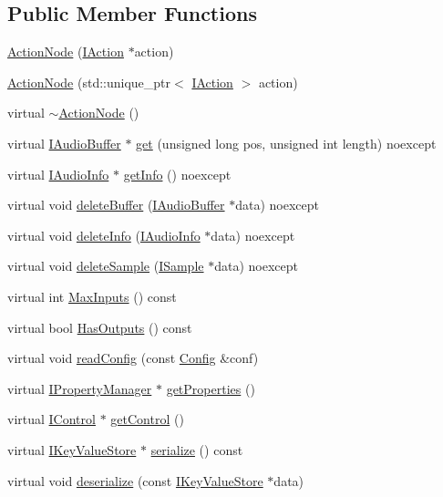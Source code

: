 \subsection*{Public Member Functions}
\begin{DoxyCompactItemize}
\item 
\hyperlink{classmaudio_1_1ActionNode_a14305cfd931a5fbec4b194153a198f62}{Action\-Node} (\hyperlink{classmaudio_1_1IAction}{I\-Action} $\ast$action)
\item 
\hyperlink{classmaudio_1_1ActionNode_a7d47bb0a6d57b72f5fbe7b59bf1535c0}{Action\-Node} (std\-::unique\-\_\-ptr$<$ \hyperlink{classmaudio_1_1IAction}{I\-Action} $>$ action)
\item 
virtual \hyperlink{classmaudio_1_1ActionNode_a2fa5aaa6854ce58dfc02a04984473d5e}{$\sim$\-Action\-Node} ()
\item 
virtual \hyperlink{classmaudio_1_1IAudioBuffer}{I\-Audio\-Buffer} $\ast$ \hyperlink{classmaudio_1_1ActionNode_a7dad30c2c187519dfb8508a088a2d842}{get} (unsigned long pos, unsigned int length) noexcept
\item 
virtual \hyperlink{classmaudio_1_1IAudioInfo}{I\-Audio\-Info} $\ast$ \hyperlink{classmaudio_1_1ActionNode_a10c712ce5741eeeeb46fc8cadf9687b5}{get\-Info} () noexcept
\item 
virtual void \hyperlink{classmaudio_1_1ActionNode_ad89fda4bd963d3176ad61dfd414596a5}{delete\-Buffer} (\hyperlink{classmaudio_1_1IAudioBuffer}{I\-Audio\-Buffer} $\ast$data) noexcept
\item 
virtual void \hyperlink{classmaudio_1_1ActionNode_a2cedf925663e0c898fae99e826586e9a}{delete\-Info} (\hyperlink{classmaudio_1_1IAudioInfo}{I\-Audio\-Info} $\ast$data) noexcept
\item 
virtual void \hyperlink{classmaudio_1_1ActionNode_ac10ce0b12b802fb444c91999337ac3dc}{delete\-Sample} (\hyperlink{classmaudio_1_1ISample}{I\-Sample} $\ast$data) noexcept
\item 
virtual int \hyperlink{classmaudio_1_1ActionNode_a6e6e10558f7cc555f1dcbe2de6b5cdb2}{Max\-Inputs} () const 
\item 
virtual bool \hyperlink{classmaudio_1_1ActionNode_a7f43a61f1da08dd12688d5480677b8c1}{Has\-Outputs} () const 
\item 
virtual void \hyperlink{classmaudio_1_1ActionNode_aba178721f832128b48adc02550545ce1}{read\-Config} (const \hyperlink{classmaudio_1_1Config}{Config} \&conf)
\item 
virtual \hyperlink{classmaudio_1_1IPropertyManager}{I\-Property\-Manager} $\ast$ \hyperlink{classmaudio_1_1ActionNode_a8f9a10275ff3bf112c7f14e896d14c06}{get\-Properties} ()
\item 
virtual \hyperlink{classmaudio_1_1IControl}{I\-Control} $\ast$ \hyperlink{classmaudio_1_1ActionNode_aa4647a1e40a0ce5f3b19098ed347b5da}{get\-Control} ()
\item 
virtual \hyperlink{classmaudio_1_1IKeyValueStore}{I\-Key\-Value\-Store} $\ast$ \hyperlink{classmaudio_1_1ActionNode_a7aa30b6bf8a68cb222472f4e20d05b13}{serialize} () const 
\item 
virtual void \hyperlink{classmaudio_1_1ActionNode_a7e416ec107ebbcb1ed6c771cf35acab5}{deserialize} (const \hyperlink{classmaudio_1_1IKeyValueStore}{I\-Key\-Value\-Store} $\ast$data)
\end{DoxyCompactItemize}
